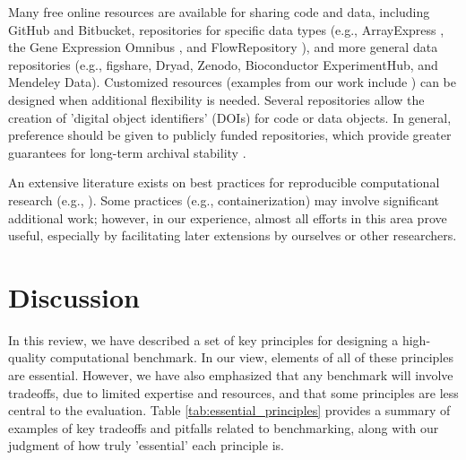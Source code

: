 Many free online resources are available for sharing code and data, including GitHub and Bitbucket, repositories for specific data types (e.g., ArrayExpress \cite{kolesnikov_arrayexpressupdatesimplifying_2015}, the Gene Expression Omnibus \cite{barrett_ncbigeoarchive_2013}, and FlowRepository \cite{spidlen_flowrepositoryresourceannotated_2012}), and more general data repositories (e.g., figshare, Dryad, Zenodo, Bioconductor ExperimentHub, and Mendeley Data). Customized resources (examples from our work include \cite{soneson_biasrobustnessscalability_2018, soneson_icobraopenreproducible_2016}) can be designed when additional flexibility is needed. Several repositories allow the creation of 'digital object identifiers' (DOIs) for code or data objects. In general, preference should be given to publicly funded repositories, which provide greater guarantees for long-term archival stability \cite{mangul_improvingusabilityarchival_2019,mangul_challengesrecommendationsimprove_2019}.

An extensive literature exists on best practices for reproducible computational research (e.g., \cite{sandve_tensimplerules_2013}). Some practices (e.g., containerization) may involve significant additional work; however, in our experience, almost all efforts in this area prove useful, especially by facilitating later extensions by ourselves or other researchers.

\section{Discussion}
In this review, we have described a set of key principles for designing a high-quality computational benchmark. In our view, elements of all of these principles are essential. However, we have also emphasized that any benchmark will involve tradeoffs, due to limited expertise and resources, and that some principles are less central to the evaluation. Table \ref{tab:essential_principles} provides a summary of examples of key tradeoffs and pitfalls related to benchmarking, along with our judgment of how truly 'essential' each principle is.

\newcommand{\mycola}[2][1]{\multirow{#1}{3.5cm}{#2}}
\newcommand{\mycolb}[2][1]{\multirow{#1}{3.5cm}{#2}}

